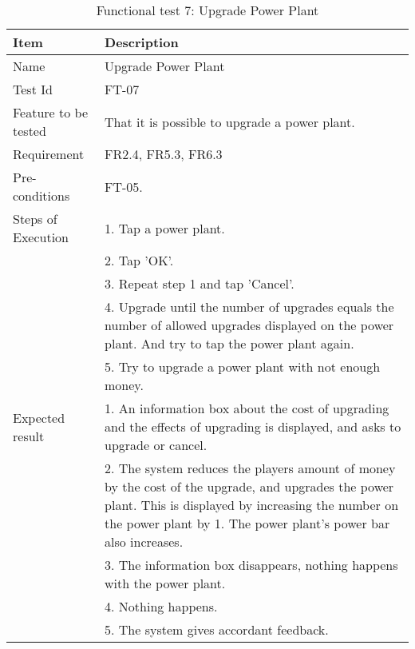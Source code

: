 \begin{table}[H]
\centering
	\begin{tabular}{ l | p{8cm} }
		\hline
		\rowcolor{lightgray}
		{\bf Item} & {\bf Description} \\ \hline
		Name & Upgrade Power Plant\\ 
		Test Id & FT-07 \\ 
		Feature to be tested & That it is possible to upgrade a power plant. \\ 
		Requirement & FR2.4, FR5.3, FR6.3 \\ 
		Pre-conditions & FT-05. \\ 
		Steps of Execution & 1. Tap a power plant. \\ 
		& 2. Tap 'OK'. \\
		& 3. Repeat step 1 and tap 'Cancel'. \\
		& 4. Upgrade until the number of upgrades equals the number of allowed upgrades displayed on the power plant. And try to tap the power plant again. \\
		& 5. Try to upgrade a power plant with not enough money. \\
		Expected result & 1. An information box about the cost of upgrading and the effects of upgrading is displayed, and asks to upgrade or cancel. \\
		& 2. The system reduces the players amount of money by the cost of the upgrade, and upgrades the power plant. This is displayed by increasing the number on the power plant by 1. The power plant's power bar also increases. \\
		& 3. The information box disappears, nothing happens with the power plant. \\
		& 4. Nothing happens. \\
		& 5. The system gives accordant feedback. \\
		\hline
	\end{tabular}
	\caption{Functional test 7: Upgrade Power Plant}
\end{table}

